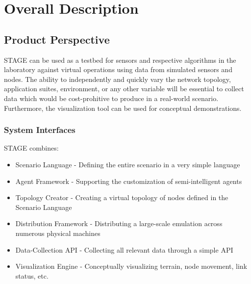 \documentclass[titlepage]{article}
\begin{document}

\section{Overall Description%
  \label{overall-description}%
}


\subsection{Product Perspective%
  \label{product-perspective}%
}

STAGE can be used as a testbed for sensors and respective algorithms in the laboratory against virtual operations using data from simulated sensors and nodes. The ability to independently and quickly vary the network topology, application suites, environment, or any other variable will be essential to collect data which would be cost-prohitive to produce in a real-world scenario. Furthermore, the visualization tool can be used for conceptual demonstrations.


\subsubsection{System Interfaces%
  \label{system-interfaces}%
}

STAGE combines:
\begin{itemize}
    \item Scenario Language - Defining the entire scenario in a very simple language
    \item Agent Framework - Supporting the customization of semi-intelligent agents
    \item Topology Creator - Creating a virtual topology of nodes defined in the Scenario Language
    \item Distribution Framework - Distributing a large-scale emulation across numerous physical machines
    \item Data-Collection API - Collecting all relevant data through a simple API
    \item Visualization Engine - Conceptually visualizing terrain, node movement, link status, etc.
\end{itemize}
\end{document}
